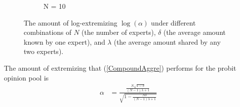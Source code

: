 \documentclass[11pt]{article}
\theoremstyle{definition}
\theoremstyle{definition}
\begin{document}
\begin{figure}[t]
\begin{subfigure}[b]{0.499\textwidth}
\caption{N = 10}
\label{ExtremeN10}
        \end{subfigure}
        \caption{ The amount of log-extremizing $\log(\alpha)$ under different combinations of $N$ (the number of experts), $\delta$ (the average amount known by one expert), and $\lambda$ (the average amount shared by any two experts).}
        \label{Levelplots}
\end{figure}

The amount of extremizing that (\ref{CompoundAggre}) performs for the probit opinion pool is
\begin{align}
\alpha &= \frac{\frac{N\sqrt{1-\delta}}{(N-1)\lambda +1}}{\sqrt{1- \frac{N\delta}{(N-1)\lambda +1} }} \label{CompoundAlpha}
\end{align}
\end{document}
